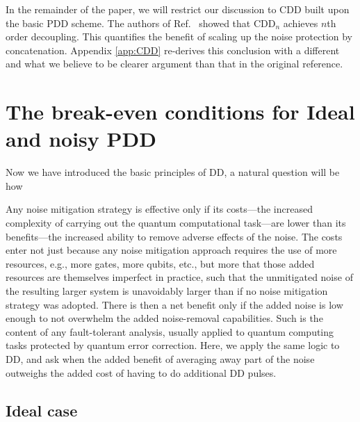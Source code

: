 \documentclass[pra,reprint,superscriptaddress]{revtex4-2}
\newcommand{\CDDn}{\mathrm{CDD}_n}
\begin{document}
In the remainder of the paper, we will restrict our discussion to CDD built upon the basic PDD scheme. The authors of Ref.~\cite{khodjasteh2005fault} showed that $\CDDn$ achieves $n$th order decoupling. This quantifies the benefit of scaling up the noise protection by concatenation. Appendix \ref{app:CDD} re-derives this conclusion with a different and what we believe to be clearer argument than that in the original reference. 





\newpage
\section{The break-even conditions for Ideal and noisy PDD}
Now we have introduced the basic principles of DD, a natural question will be 
how 


Any noise mitigation strategy is effective only if its costs---the increased complexity of carrying out the quantum computational task---are lower than its benefits---the increased ability to remove adverse effects of the noise. The costs enter not just because any noise mitigation approach requires the use of more resources, e.g., more gates, more qubits, etc., but more that those added resources are themselves imperfect in practice, such that the unmitigated noise of the resulting larger system is unavoidably larger than if no noise mitigation strategy was adopted. There is then a net benefit only if the added noise is low enough to not overwhelm the added noise-removal capabilities. Such is the content of any fault-tolerant analysis, usually applied to quantum computing tasks protected by quantum error correction. Here, we apply the same logic to DD, and ask when the added benefit of averaging away part of the noise outweighs the added cost of having to do additional DD pulses.




\subsection{Ideal case}
\end{document}
